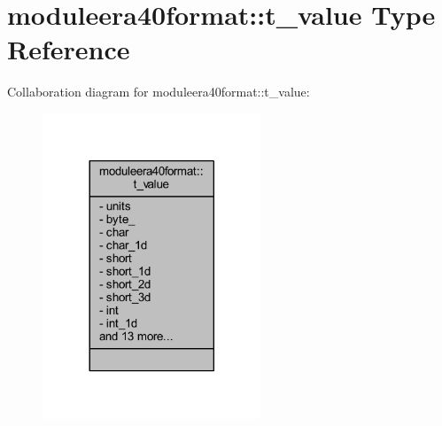 \hypertarget{structmoduleera40format_1_1t__value}{}\section{moduleera40format\+:\+:t\+\_\+value Type Reference}
\label{structmoduleera40format_1_1t__value}


Collaboration diagram for moduleera40format\+:\+:t\+\_\+value\+:\nopagebreak
\begin{figure}[H]
\begin{center}
\leavevmode
\includegraphics[width=185pt]{structmoduleera40format_1_1t__value__coll__graph}
\end{center}
\end{figure}
